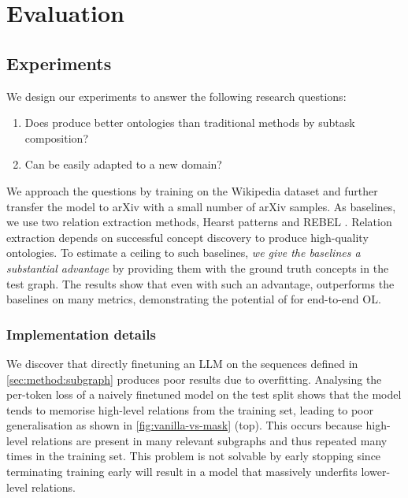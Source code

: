 \chapter{Evaluation}

\section{Experiments}

We design our experiments to answer the following research questions:
\begin{enumerate}
    \item Does \name produce better ontologies than traditional methods by subtask composition?
    \item Can \name be easily adapted to a new domain?
\end{enumerate}
We approach the questions by training \name on the Wikipedia dataset and further transfer the model to arXiv with a small number of arXiv samples. As baselines, we use two relation extraction methods, Hearst patterns \cite{hearst1998automated,roller2018hearst} and REBEL \cite{cabot2021rebel}. Relation extraction depends on successful concept discovery to produce high-quality ontologies. To estimate a ceiling to such baselines, \emph{we give the baselines a substantial advantage} by providing them with the ground truth concepts in the test graph. The results show that even with such an advantage, \name outperforms the baselines on many metrics, demonstrating the potential of \name for end-to-end OL.

\subsection{Implementation details}  \label{sec:implementation}





We discover that directly finetuning an LLM on the sequences defined in \cref{sec:method:subgraph} produces poor results due to overfitting. Analysing the per-token loss of a naively finetuned model on the test split shows that the model tends to memorise high-level relations from the training set, leading to poor generalisation as shown in \cref{fig:vanilla-vs-mask} (top). This occurs because high-level relations are present in many relevant subgraphs and thus repeated many times in the training set. This problem is not solvable by early stopping since terminating training early will result in a model that massively underfits lower-level relations.

